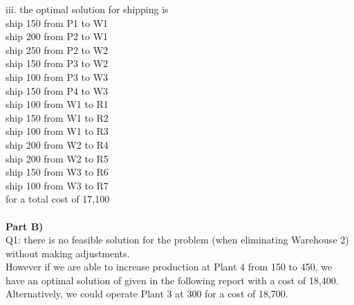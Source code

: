 \documentclass[12pt]{report}
\begin{document}
iii.  the optimal solution for shipping is\\
ship 150 from P1 to W1\\
ship 200 from P2 to W1\\
ship 250 from P2 to W2\\
ship 150 from P3 to W2\\
ship 100 from P3 to W3\\
ship 150 from P4 to W3\\
ship 100 from W1 to R1\\
ship 150 from W1 to R2\\
ship 100 from W1 to R3\\
ship 200 from W2 to R4\\
ship 200 from W2 to R5\\
ship 150 from W3 to R6\\
ship 100 from W3 to R7\\
for a total cost of 17,100\\
\\

\textbf{Part B)}\\
Q1: there is no feasible solution for the problem (when eliminating Warehouse 2) without making adjustments.\\
However if we are able to increase production at Plant 4 from 150 to 450, we have an optimal solution of 
given in the following report with a cost of 18,400.  Alternatively, we could operate Plant 3 at 300 for a cost of 18,700.\\
\end{document}
